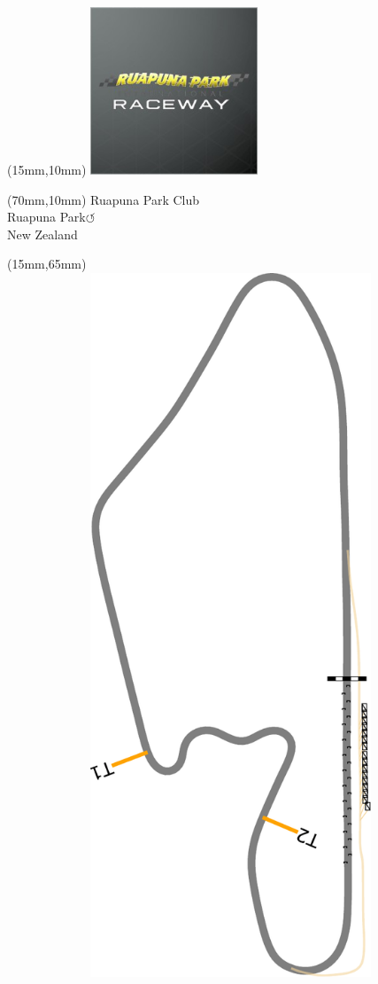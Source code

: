 \null\newpage
\begin{textblock*}{50mm}(15mm,10mm)%
\includegraphics[width=50mm]{LG/RUPU.png}
\end{textblock*}
\begin{textblock*}{130mm}(70mm,10mm)%
{\fontsize{20}{20}\selectfont Ruapuna Park Club\\}
{\fontsize{16}{16}\selectfont Ruapuna Park\hfill \huge$\circlearrowleft$\\}
{\fontsize{12}{12}\selectfont New Zealand\\}
\end{textblock*}
\begin{textblock*}{185mm}(15mm,65mm)%
\centering
\mbox{\includegraphics[width=185mm,height=210mm,keepaspectratio]{PT/RPCL.pdf}}
\end{textblock*}
